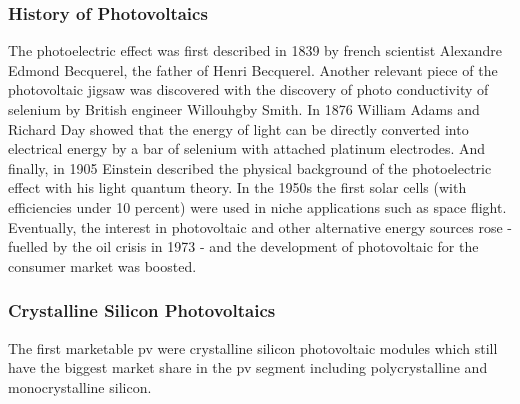 \subsubsection{History of Photovoltaics}
The photoelectric effect was first described in 1839 by french scientist Alexandre Edmond Becquerel\cite{becquerel1839memoire}, the father of Henri Becquerel. 
Another relevant piece of the photovoltaic jigsaw was discovered 
with the discovery of photo conductivity of selenium
by British engineer Willouhgby Smith\cite{Smith1873Selenium}.
In 1876 William Adams and Richard Day\cite{Adams1876Selenium} showed that 
the energy of light can be directly converted into electrical energy by a bar of 
selenium with attached platinum electrodes.
And finally, in 1905 Einstein described the physical background of the photoelectric 
effect with his light quantum theory\cite{einstein1905erzeugung}.
In the 1950s the first solar cells (with efficiencies under 10 percent) were used in niche applications such as space flight. 
Eventually, the interest in photovoltaic and other alternative energy sources 
rose - fuelled by the oil crisis in 1973 - 
and the development of photovoltaic for the consumer market was boosted. \\

\subsubsection{Crystalline Silicon Photovoltaics}
The first marketable \gls{pv} were crystalline silicon photovoltaic modules which still have the biggest market share in the \gls{pv} segment including polycrystalline and monocrystalline silicon.


